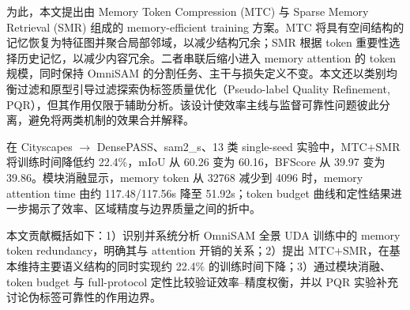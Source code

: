 为此，本文提出由 Memory Token Compression (MTC) 与 Sparse Memory Retrieval (SMR) 组成的 memory-efficient training 方案。MTC 将具有空间结构的记忆恢复为特征图并聚合局部邻域，以减少结构冗余；SMR 根据 token 重要性选择历史记忆，以减少内容冗余。二者串联后缩小进入 memory attention 的 token 规模，同时保持 OmniSAM 的分割任务、主干与损失定义不变。本文还以类别均衡过滤和原型引导过滤探索伪标签质量优化（Pseudo-label Quality Refinement, PQR），但其作用仅限于辅助分析。该设计使效率主线与监督可靠性问题彼此分离，避免将两类机制的效果合并解释。

在 Cityscapes $\rightarrow$ DensePASS、sam2\_s、13 类 single-seed 实验中，MTC+SMR 将训练时间降低约 22.4\%，mIoU 从 60.26 变为 60.16，BFScore 从 39.97 变为 39.86。模块消融显示，memory token 从 32768 减少到 4096 时，memory attention time 由约 117.48/117.56s 降至 51.92s；token budget 曲线和定性结果进一步揭示了效率、区域精度与边界质量之间的折中。

本文贡献概括如下：1）识别并系统分析 OmniSAM 全景 UDA 训练中的 memory token redundancy，明确其与 attention 开销的关系；2）提出 MTC+SMR，在基本维持主要语义结构的同时实现约 22.4\% 的训练时间下降；3）通过模块消融、token budget 与 full-protocol 定性比较验证效率--精度权衡，并以 PQR 实验补充讨论伪标签可靠性的作用边界。
